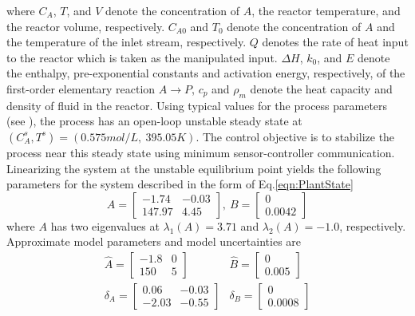 \documentclass[letterpaper, 10 pt, conference]{ieeeconf}\IEEEoverridecommandlockouts%
\begin{document}
where $C_A$, $T$, and $V$ denote the concentration of $A$, the reactor temperature, and the reactor volume, respectively. $C_{A0}$ and $T_{0}$ denote the concentration of $A$ and the temperature of the inlet stream, respectively. $Q$ denotes the rate of heat input to the reactor which is taken as the manipulated input. $\Delta H$, $k_0$, and $E$ denote the enthalpy, pre-exponential constants and activation energy, respectively, of the first-order elementary reaction $A \rightarrow P$, $c_p$ and $\rho_m$ denote the heat capacity and density of fluid in the reactor. Using typical values for the process parameters (see \cite{christofides2005control}), the process has an open-loop unstable steady state at $(C_{A}^s, T^s) = (0.575 mol/L,\ 395.05 K)$. The control objective is to stabilize the process near this steady state using minimum sensor-controller communication. Linearizing the system at the unstable equilibrium point yields the following parameters for the system described in the form of Eq.\ref{eqn:PlantState}
\begin{equation}
    A = \left[\begin{array}{cc}
        -1.74   & -0.03\\
        147.97  & 4.45
      \end{array}\right],\
    B = \left[\begin{array}{c} 0 \\ 0.0042 \end{array}\right]
\end{equation}
where $A$ has two eigenvalues at $\lambda_1(A) = 3.71$ and $\lambda_2(A) = -1.0$, respectively. Approximate model parameters and model uncertainties are
\begin{equation}\label{eqn:ModelPara}
  \begin{array}{ll}
  \widehat{A} = \left[\begin{array}{cc}
      -1.8  & 0\\
      150   & 5
    \end{array}\right] &
  \widehat{B} = \left[\begin{array}{c} 0 \\ 0.005 \end{array}\right]\\
  \delta_A = \left[\begin{array}{cc}
      0.06    & -0.03\\
      -2.03   & -0.55
    \end{array}\right] &
  \delta_B = \left[\begin{array}{c} 0 \\ 0.0008 \end{array}\right]
  \end{array}
\end{equation}
\end{document}
